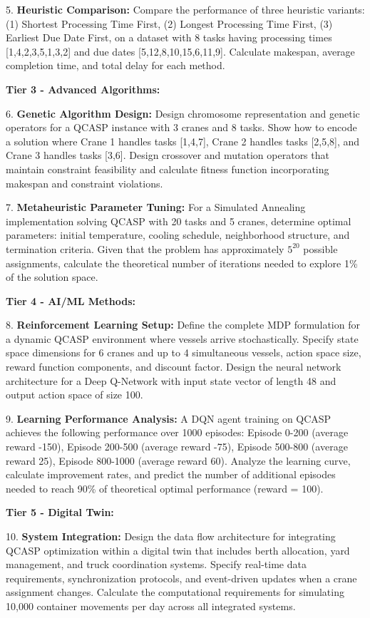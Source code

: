 \documentclass{article}
\begin{document}
5. \textbf{Heuristic Comparison:} Compare the performance of three heuristic variants: (1) Shortest Processing Time First, (2) Longest Processing Time First, (3) Earliest Due Date First, on a dataset with 8 tasks having processing times [1,4,2,3,5,1,3,2] and due dates [5,12,8,10,15,6,11,9]. Calculate makespan, average completion time, and total delay for each method.

\textbf{Tier 3 - Advanced Algorithms:}

6. \textbf{Genetic Algorithm Design:} Design chromosome representation and genetic operators for a QCASP instance with 3 cranes and 8 tasks. Show how to encode a solution where Crane 1 handles tasks [1,4,7], Crane 2 handles tasks [2,5,8], and Crane 3 handles tasks [3,6]. Design crossover and mutation operators that maintain constraint feasibility and calculate fitness function incorporating makespan and constraint violations.

7. \textbf{Metaheuristic Parameter Tuning:} For a Simulated Annealing implementation solving QCASP with 20 tasks and 5 cranes, determine optimal parameters: initial temperature, cooling schedule, neighborhood structure, and termination criteria. Given that the problem has approximately $5^{20}$ possible assignments, calculate the theoretical number of iterations needed to explore 1\% of the solution space.

\textbf{Tier 4 - AI/ML Methods:}

8. \textbf{Reinforcement Learning Setup:} Define the complete MDP formulation for a dynamic QCASP environment where vessels arrive stochastically. Specify state space dimensions for 6 cranes and up to 4 simultaneous vessels, action space size, reward function components, and discount factor. Design the neural network architecture for a Deep Q-Network with input state vector of length 48 and output action space of size 100.

9. \textbf{Learning Performance Analysis:} A DQN agent training on QCASP achieves the following performance over 1000 episodes: Episode 0-200 (average reward -150), Episode 200-500 (average reward -75), Episode 500-800 (average reward 25), Episode 800-1000 (average reward 60). Analyze the learning curve, calculate improvement rates, and predict the number of additional episodes needed to reach 90\% of theoretical optimal performance (reward = 100).

\textbf{Tier 5 - Digital Twin:}

10. \textbf{System Integration:} Design the data flow architecture for integrating QCASP optimization within a digital twin that includes berth allocation, yard management, and truck coordination systems. Specify real-time data requirements, synchronization protocols, and event-driven updates when a crane assignment changes. Calculate the computational requirements for simulating 10,000 container movements per day across all integrated systems.
\end{document}
